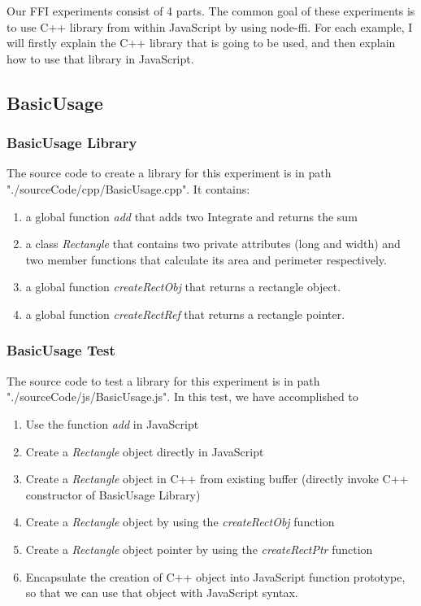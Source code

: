        
   Our FFI experiments consist of 4 parts. The common goal of these experiments is to use C++ library from within JavaScript by using node-ffi. For each example, I will firstly explain the C++ library that is going to be used, and then explain how to use that library in JavaScript.
       
\subsection{BasicUsage}    

\subsubsection{BasicUsage Library}
  The source code to create a library for this experiment is in path "./sourceCode/cpp/BasicUsage.cpp". It contains:
    \begin{enumerate}
        \item a global function \textit{add} that adds two Integrate and returns the sum 
        \item a class \textit{Rectangle} that contains two private attributes (long and width) and two member functions that calculate its area and perimeter respectively.
        \item a global function \textit{createRectObj} that returns a rectangle object.
        \item a global function \textit{createRectRef} that returns a rectangle pointer.
    \end{enumerate}   
       
\subsubsection{BasicUsage Test}
    The source code to test a library for this experiment is in path "./sourceCode/js/BasicUsage.js". In this test, we have accomplished to
    \begin{enumerate}
        \item Use the function \textit{add} in JavaScript
        \item Create a \textit{Rectangle} object directly in JavaScript
        \item Create a \textit{Rectangle} object in C++ from existing buffer (directly invoke C++ constructor of BasicUsage Library)
        \item Create a \textit{Rectangle} object by using the \textit{createRectObj} function
        \item Create a \textit{Rectangle} object pointer by using the \textit{createRectPtr} function
        \item Encapsulate the creation of C++ object into JavaScript function prototype, so that we can use that object with JavaScript syntax.
    \end{enumerate}
    
